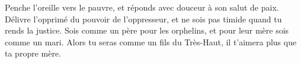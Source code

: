 Penche l’oreille vers le pauvre,
	et réponds avec douceur à son salut de paix.
Délivre l’opprimé du pouvoir de l’oppresseur,
	et ne sois pas timide quand tu rends la justice.
Sois comme un père pour les orphelins, et pour leur mère sois comme un mari.
	Alors tu seras comme un fils du Très-Haut, il t’aimera plus que ta propre mère.
